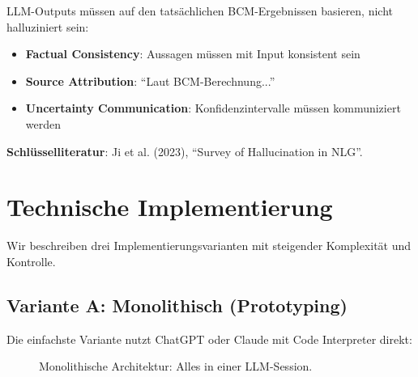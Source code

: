 \documentclass[12pt,a4paper]{article}
\begin{document}
LLM-Outputs müssen auf den tatsächlichen BCM-Ergebnissen basieren, nicht halluziniert sein:

\begin{itemize}
    \item \textbf{Factual Consistency}: Aussagen müssen mit Input konsistent sein
    \item \textbf{Source Attribution}: ``Laut BCM-Berechnung...''
    \item \textbf{Uncertainty Communication}: Konfidenzintervalle müssen kommuniziert werden
\end{itemize}

\textbf{Schlüsselliteratur}: Ji et al. (2023), ``Survey of Hallucination in NLG''.

\section{Technische Implementierung}

Wir beschreiben drei Implementierungsvarianten mit steigender Komplexität und Kontrolle.

\subsection{Variante A: Monolithisch (Prototyping)}

Die einfachste Variante nutzt ChatGPT oder Claude mit Code Interpreter direkt:

\begin{figure}[h]
\centering
{}
\caption{Monolithische Architektur: Alles in einer LLM-Session.}
\end{figure}
\end{document}
